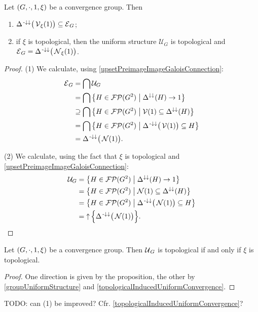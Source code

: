 \begin{proposition} \label{entourageConvergenceGroup}
Let $\sSet{G,\cdot, 1, \xi}$ be a convergence group. Then
\begin{enumerate}
\item $\Delta^{{\text{\hspace{0.15em}-}\downarrow}\downarrow}\big(\operatorname{\mathcal{V}}_\xi(1)\big) \subseteq \operatorname{\mathcal{E}}_{G}$;
\item if $\xi$ is topological, then the uniform structure $\mathcal{U}_G$ is topological and $\operatorname{\mathcal{E}}_{G} = \Delta^{{\text{\hspace{0.15em}-}\downarrow}\downarrow}\big(\operatorname{\mathcal{N}}_\xi(1)\big)$.
\end{enumerate}
\end{proposition}
\begin{proof}
(1) We calculate, using \ref{upsetPreimageImageGaloisConnection}:
\begin{align*}
\entourage_G &= \bigcap \mathcal{U}_G \\
&= \bigcap \setbuilder{H\in \powerfilters(G^2)}{\Delta^{\imf\imf}(H) \to 1} \\
&\supseteq \bigcap \setbuilder{H\in \powerfilters(G^2)}{\vicinity(1) \subseteq \Delta^{\imf\imf}(H)} \\
&= \bigcap \setbuilder{H\in \powerfilters(G^2)}{\Delta^{\preimf\imf}\big(\vicinity(1)\big) \subseteq H} \\
&= \Delta^{\preimf\imf}\big(\neighbourhood(1)\big).
\end{align*}

(2) We calculate, using the fact that $\xi$ is topological and \ref{upsetPreimageImageGaloisConnection}:
\begin{align*}
\mathcal{U}_G &= \setbuilder{H\in \powerfilters(G^2)}{\Delta^{\imf\imf}(H) \to 1} \\
&= \setbuilder{H\in \powerfilters(G^2)}{\neighbourhood(1) \subseteq \Delta^{\imf\imf}(H)} \\
&= \setbuilder{H\in \powerfilters(G^2)}{\Delta^{\preimf\imf}\big(\neighbourhood(1)\big) \subseteq H} \\
&= \upset\Big\{\Delta^{\preimf\imf}\big(\neighbourhood(1)\big)\Big\}.
\end{align*}
\end{proof}
\begin{corollary} \label{convergenceGroupTopologicalIffUniformlyTopological}
Let $\sSet{G, \cdot, 1, \xi}$ be a convergence group. Then $\operatorname{\mathcal{U}}_G$ is topological \textup{if and only if} $\xi$ is topological.
\end{corollary}
\begin{proof}
One direction is given by the proposition, the other by \ref{groupUniformStructure} and \ref{topologicalInducedUniformConvergence}.
\end{proof}
TODO: can (1) be improved? Cfr. \ref{topologicalInducedUniformConvergence}?

